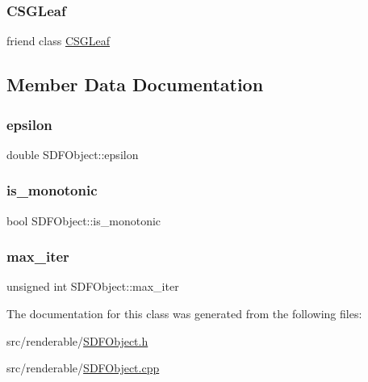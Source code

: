 \subsubsection{\texorpdfstring{CSGLeaf}{CSGLeaf}}
{\footnotesize\ttfamily friend class \mbox{\hyperlink{classCSGLeaf}{C\+S\+G\+Leaf}}\hspace{0.3cm}{\ttfamily [friend]}}



\subsection{Member Data Documentation}
\mbox{\label{classSDFObject_a5bcc7f77148687f9545f0ade0db6c7f0}} 
\subsubsection{\texorpdfstring{epsilon}{epsilon}}
{\footnotesize\ttfamily double S\+D\+F\+Object\+::epsilon\hspace{0.3cm}{\ttfamily [private]}}

\mbox{\label{classSDFObject_af366e048b8af77961de4a1c5a45dc110}} 
\subsubsection{\texorpdfstring{is\_monotonic}{is\_monotonic}}
{\footnotesize\ttfamily bool S\+D\+F\+Object\+::is\+\_\+monotonic\hspace{0.3cm}{\ttfamily [private]}}

\mbox{\label{classSDFObject_aff2946d73110ace629e66f9eac2c13aa}} 
\subsubsection{\texorpdfstring{max\_iter}{max\_iter}}
{\footnotesize\ttfamily unsigned int S\+D\+F\+Object\+::max\+\_\+iter\hspace{0.3cm}{\ttfamily [private]}}



The documentation for this class was generated from the following files\+:\begin{DoxyCompactItemize}
\item 
src/renderable/\mbox{\hyperlink{SDFObject_8h}{S\+D\+F\+Object.\+h}}\item 
src/renderable/\mbox{\hyperlink{SDFObject_8cpp}{S\+D\+F\+Object.\+cpp}}\end{DoxyCompactItemize}
